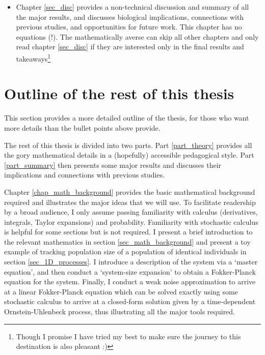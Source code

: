 \begin{itemize}
\begin{itemize}
			\item Chapter \ref{sec_disc} provides a non-technical discussion and summary of all the major results, and discusses biological implications, connections with previous studies, and opportunities for future work. This chapter has no equations (!). The mathematically averse can skip all other chapters and only read chapter \ref{sec_disc} if they are interested only in the final results and takeaways\footnote{Though I promise I have tried my best to make sure the journey to this destination is also pleasant :)} 
		\end{itemize}
\end{itemize}

\section{Outline of the rest of this thesis}

This section provides a more detailed outline of the thesis, for those who want more details than the bullet points above provide.

The rest of this thesis is divided into two parts. Part \ref{part_theory} provides all the gory mathematical details in a (hopefully) accessible pedagogical style. Part \ref{part_summary} then presents some major results and discusses their implications and connections with previous studies.

Chapter \ref{chap_math_background} provides the basic mathematical background required and illustrates the major ideas that we will use. To facilitate readership by a broad audience, I only assume passing familiarity with calculus (derivatives, integrals, Taylor expansions) and probability. Familiarity with stochastic calculus is helpful for some sections but is not required. I present a brief introduction to the relevant mathematics in section \ref{sec_math_background} and present a toy example of tracking population size of a population of identical individuals in section \ref{sec_1D_processes}. I introduce a description of the system via a `master equation', and then conduct a `system-size expansion' to obtain a Fokker-Planck equation for the system. Finally, I conduct a weak noise approximation to arrive at a linear Fokker-Planck equation which can be solved exactly using some stochastic calculus to arrive at a closed-form solution given by a time-dependent Ornstein-Uhlenbeck process, thus illustrating all the major tools required.


